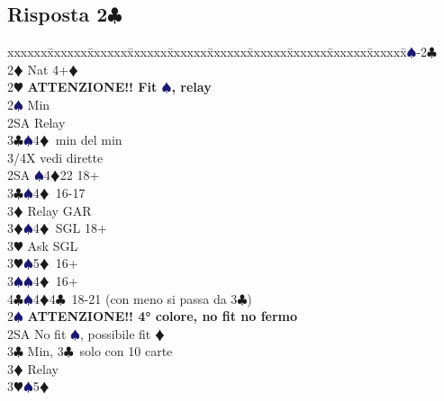 \documentclass[a4paper,italian]{article}
\newcommand{\BC}{\textcolor{OliveGreen}{$\clubsuit$}}
\newcommand{\BD}{\textcolor{RedOrange}{$\vardiamondsuit$}}
\newcommand{\BH}{\textcolor{Red2}{$\varheartsuit${}}}
\newcommand{\BS}{\textcolor{MidnightBlue}{$\spadesuit${}}}
\newcommand{\pdfc}{\texorpdfstring{\BC{}}{C}}
\newenvironment{bidtable}
{\begin{tabbing}

    xxxxxx\=xxxxxx\=xxxxxx\=xxxxxx\=xxxxxx\=xxxxxx\=xxxxxx\=xxxxxx\=xxxxxx\=xxxxxx\=\kill}
{\end{tabbing} }%
\begin{document}
                                    \subsection{Risposta 2\pdfc}
                                    \begin{multicols}{2}
                                        \begin{bidtable}
                                            1\BS-2\BC\\
                                            2\BD \> Nat 4+\BD \+\\
                                            2\BH \> \textbf{ATTENZIONE!! Fit \BS , relay}\+\\
                                            2\BS \> Min\+\\
                                            2SA \> Relay\+\\
                                            3\BC {}\BS 4\BD\ min del min\\
                                            3/4X \> vedi dirette\-\-\\
                                            2SA \BS 4\BD 22 18+\\
                                            3\BC {}\BS 4\BD\ 16-17\+\\
                                            3\BD \> Relay GAR\-\\
                                            3\BD {}\BS 4\BD\ SGL 18+\+\\
                                            3\BH \> Ask SGL\-\\
                                            3\BH {}\BS 5\BD\ 16+\\
                                            3\BS {}\BS 4\BD\ 16+\\
                                            4\BC {}\BS 4\BD 4\BC\ 18-21 (con meno si passa da 3\BC )\-\\
                                            2\BS \> \textbf{ATTENZIONE!! 4° colore, no fit no fermo}\\
                                            2SA \> No fit \BS , possibile fit \BD\+\\
                                            3\BC \> Min, 3\BC\ solo con 10 carte\+\\
                                            3\BD \> Relay\+\\
                                            3\BH {}\BS 5\BD \\

\end{bidtable}
\end{multicols}
\end{document}
